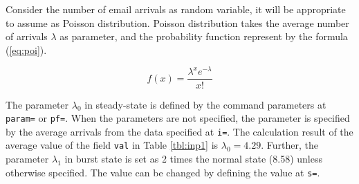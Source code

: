 Consider the number of email arrivals as random variable, it will be appropriate to assume as Poisson distribution.  
Poisson distribution takes the average number of arrivals $\lambda$ as parameter, and the probability function represent by the formula (\ref{eq:poi}).
 
\begin{equation}
f(x)=\frac{\lambda^x e^{-λ}}{x!}
\label{eq:poi}
\end{equation}

The parameter $\lambda_0$ in steady-state is defined by the command parameters at \verb|param=| or \verb|pf=|. When the parameters are not specified, the parameter is specified by the average arrivals from the data specified at \verb|i=|.
The calculation result of the average value of the field \verb|val| in Table \ref{tbl:inp1} is $\lambda_0=4.29$.
Further, the parameter $\lambda_1$ in burst state is set as 2 times the normal state (8.58) unless otherwise specified. 
The value can be changed by defining the value at \verb|s=|.

